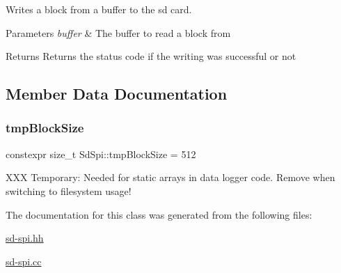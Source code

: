 Writes a block from a buffer to the sd card. 


\begin{DoxyParams}{Parameters}
{\em buffer} & The buffer to read a block from \\
\hline
\end{DoxyParams}
\begin{DoxyReturn}{Returns}
Returns the status code if the writing was successful or not 
\end{DoxyReturn}


\subsection{Member Data Documentation}
\mbox{\label{class_sd_spi_a2eedef2fa6ec9844743e4e0de6f03261}} 
\subsubsection{\texorpdfstring{tmp\+Block\+Size}{tmpBlockSize}}
{\footnotesize\ttfamily constexpr size\+\_\+t Sd\+Spi\+::tmp\+Block\+Size = 512\hspace{0.3cm}{\ttfamily [static]}}

X\+XX Temporary\+: Needed for static arrays in data logger code. Remove when switching to filesystem usage! 

The documentation for this class was generated from the following files\+:\begin{DoxyCompactItemize}
\item 
\hyperlink{sd-spi_8hh}{sd-\/spi.\+hh}\item 
\hyperlink{sd-spi_8cc}{sd-\/spi.\+cc}\end{DoxyCompactItemize}
